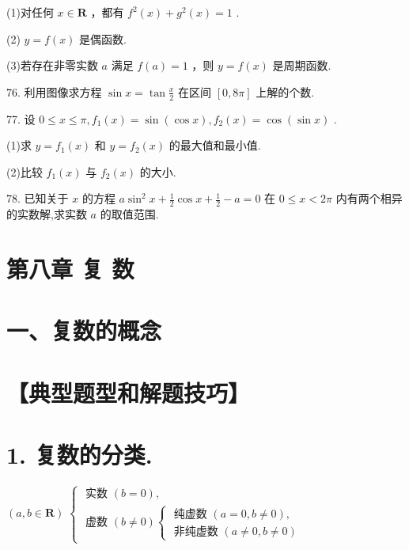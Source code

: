 \documentclass[10pt]{article}
\begin{document}
(1)对任何 \(x \in  \mathbf{R}\) ，都有 \({f}^{2}\left( x\right)  + {g}^{2}\left( x\right)  = 1\) .

(2) \(y = f\left( x\right)\) 是偶函数.

(3)若存在非零实数 \(a\) 满足 \(f\left( a\right)  = 1\) ，则 \(y = f\left( x\right)\) 是周期函数.

76. 利用图像求方程 \(\sin x = \tan \frac{x}{2}\) 在区间 \(\left\lbrack  {0,{8\pi }}\right\rbrack\) 上解的个数.

77. 设 \(0 \leq  x \leq  \pi ,{f}_{1}\left( x\right)  = \sin \left( {\cos x}\right) ,{f}_{2}\left( x\right)  = \cos \left( {\sin x}\right)\) .

(1)求 \(y = {f}_{1}\left( x\right)\) 和 \(y = {f}_{2}\left( x\right)\) 的最大值和最小值.

(2)比较 \({f}_{1}\left( x\right)\) 与 \({f}_{2}\left( x\right)\) 的大小.

78. 已知关于 \(x\) 的方程 \(a{\sin }^{2}x + \frac{1}{2}\cos x + \frac{1}{2} - a = 0\) 在 \(0 \leq  x < {2\pi }\) 内有两个相异的实数解,求实数 \(a\) 的取值范围.

\section*{第八章 复 数}

\section*{一、复数的概念}

\section*{【典型题型和解题技巧】}

\section*{1. 复数的分类.}

\(\left( {a,b \in  \mathbf{R}}\right) \;\left\{  \begin{array}{l} \text{ 实数 }\left( {b = 0}\right) , \\  \text{ 虚数 }\left( {b \neq  0}\right) \left\{  \begin{array}{l} \text{ 纯虚数 }\left( {a = 0,b \neq  0}\right) , \\  \text{ 非纯虚数 }\left( {a \neq  0,b \neq  0}\right)  \end{array}\right.  \end{array}\right.\)
\end{document}
